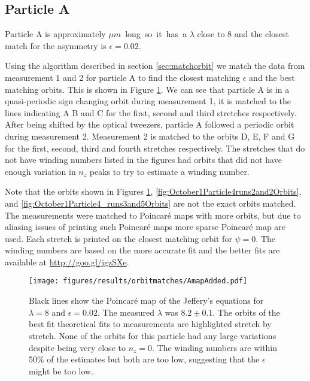 \subsection{Particle A}
Particle A is approximately \unit[24]{$\mu m$} long so it has a $\lambda$ close to 8 and the closest match for the asymmetry is $\epsilon = 0.02$. 

Using the algorithm described in section \ref{sec:matchorbit} we match the data from measurement 1 and 2 for particle A to find the closest matching $\epsilon$ and the best matching orbits. This is shown in Figure \ref{fig:particleAOrbitFit}. We can see that particle A is in a quasi-periodic sign changing orbit during measurement 1, it is matched to the lines indicating A B and C for the first, second and third stretches respectively.  After being shifted by the optical tweezers, particle A followed a periodic orbit during measurement 2. Measurement 2 is matched to the orbits D, E, F and G for the first, second, third and fourth stretches respectively. The stretches that do not have winding numbers listed in the figures had orbits that did not have enough variation in $n_z$ peaks to try to estimate a winding number. 

Note that the orbits shown in Figures \ref{fig:particleAOrbitFit}, \ref{fig:October1Particle4runs2and2Orbits}, and \ref{fig:October1Particle4_runs3and5Orbits} are not the exact orbits matched. The measurements were matched to Poincaré maps with more orbits, but due to aliasing issues of printing such Poincaré maps more sparse Poincaré map are used. Each stretch is printed on the closest matching orbit for $\psi = 0$. The winding numbers are based on the more accurate fit and the better fits are available at \url{http://goo.gl/jgzSXe}. 

\begin{figure}[H]
\begin{center}
\texttt{[image: figures/results/orbitmatches/AmapAdded.pdf]}
\end{center}
\caption{Black lines show the Poincaré map of the Jeffery's equations for $\lambda = 8$ and $\epsilon = 0.02$. The measured $\lambda$ was $8.2 \pm 0.1$. The orbits of the best fit theoretical fits to measurements are highlighted stretch by stretch. None of the orbits for this particle had any large variations despite being very close to $n_z=0$. The winding numbers are within 50\% of the estimates but both are too low, suggesting that the $\epsilon$ might be too low.}
\label{fig:particleAOrbitFit}
\end{figure}

